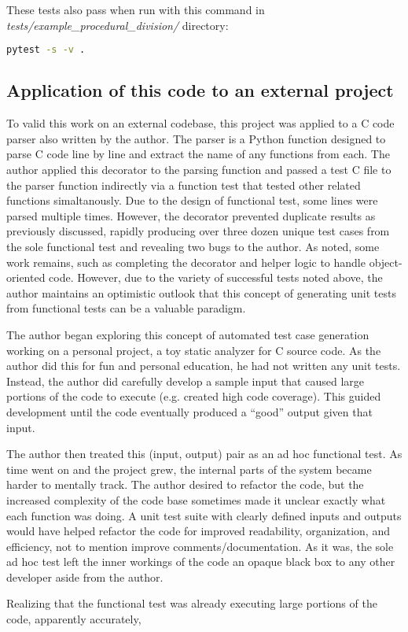 These tests also pass when run with this command in 
\linebreak
\textit{tests/example\_procedural\_division/} directory:
\begin{lstlisting}[language=bash, caption={Running all generated unit
   tests for the division example}]
    pytest -s -v .
\end{lstlisting}

\subsection{Application of this code to an external project}\label{sec:eval-2}
To valid this work on an external codebase, this project was applied to a 
C code parser also written by the author.  The parser is a Python 
function designed to parse C code line by line
and extract the name of any functions from each.  The author applied this
decorator to the parsing function and passed a test C file to the parser
function indirectly via a function test that tested other related 
functions simaltanously.
%
Due to the design of functional test, some lines were parsed multiple times.  
However, the decorator prevented duplicate results as previously discussed, 
rapidly producing over three dozen unique test cases 
from the sole functional test and revealing two bugs to the author.
%
As noted, some work remains, such as completing the decorator and helper logic
to handle object-oriented code.  However, due to the variety of successful 
tests noted above, the author maintains an optimistic outlook that this concept
of generating unit tests from functional tests can be a valuable paradigm.

The author began exploring this concept of automated test case generation
working on a personal project, a toy static analyzer for C source code.  As the
author did this for fun and personal education, he had not written any unit
tests.  Instead, the author did carefully develop a sample input that caused large
portions of the code to execute (e.g. created high code coverage).  This guided
development until the code eventually produced a “good” output given that input.

  
\indent
The author then treated this (input, output) pair as an ad hoc functional test.
As time went on and the project grew, the internal parts of the system became
harder to mentally track.  The author desired to refactor the code, but the
increased complexity of the code base sometimes made it unclear exactly what
each function was doing.  A unit test suite with clearly defined inputs and
outputs would have helped refactor the code for improved readability,
organization, and efficiency, not to mention improve comments/documentation.  As
it was, the sole ad hoc test left the inner workings of the code an opaque black
box to any other developer aside from the author.

Realizing that the functional test was already executing large portions of the
code, apparently accurately, 

